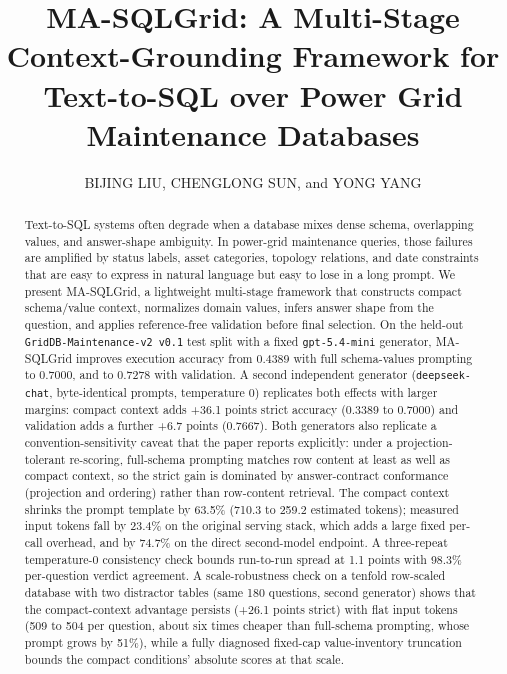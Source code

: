 \documentclass{ieeeaccess}
\begin{document}
\title{MA-SQLGrid: A Multi-Stage Context-Grounding Framework for Text-to-SQL over Power Grid Maintenance Databases}
\author{\uppercase{Bijing Liu}, \uppercase{Chenglong Sun}, and \uppercase{Yong Yang}}
\address[1]{NARI Group Corporation (State Grid Electric Power Research Institute), Nanjing 211106, Jiangsu Province, China}
\address[2]{Beijing Kedong Electric Power Control System Co., Ltd., Beijing 100080, China}

\begin{abstract}
Text-to-SQL systems often degrade when a database mixes dense schema, overlapping values, and answer-shape ambiguity. In power-grid maintenance queries, those failures are amplified by status labels, asset categories, topology relations, and date constraints that are easy to express in natural language but easy to lose in a long prompt. We present MA-SQLGrid, a lightweight multi-stage framework that constructs compact schema/value context, normalizes domain values, infers answer shape from the question, and applies reference-free validation before final selection. On the held-out \texttt{GridDB-Maintenance-v2\ v0.1} test split with a fixed \texttt{gpt-5.4-mini} generator, MA-SQLGrid improves execution accuracy from 0.4389 with full schema-values prompting to 0.7000, and to 0.7278 with validation. A second independent generator (\texttt{deepseek-chat}, byte-identical prompts, temperature 0) replicates both effects with larger margins: compact context adds +36.1 points strict accuracy (0.3389 to 0.7000) and validation adds a further +6.7 points (0.7667). Both generators also replicate a convention-sensitivity caveat that the paper reports explicitly: under a projection-tolerant re-scoring, full-schema prompting matches row content at least as well as compact context, so the strict gain is dominated by answer-contract conformance (projection and ordering) rather than row-content retrieval. The compact context shrinks the prompt template by 63.5\% (710.3 to 259.2 estimated tokens); measured input tokens fall by 23.4\% on the original serving stack, which adds a large fixed per-call overhead, and by 74.7\% on the direct second-model endpoint. A three-repeat temperature-0 consistency check bounds run-to-run spread at 1.1 points with 98.3\% per-question verdict agreement. A scale-robustness check on a tenfold row-scaled database with two distractor tables (same 180 questions, second generator) shows that the compact-context advantage persists (+26.1 points strict) with flat input tokens (509 to 504 per question, about six times cheaper than full-schema prompting, whose prompt grows by 51\%), while a fully diagnosed fixed-cap value-inventory truncation bounds the compact conditions' absolute scores at that scale.
\end{abstract}
\end{document}

